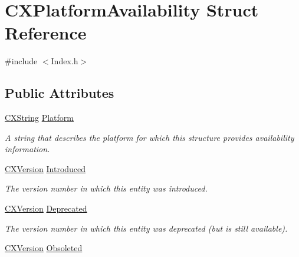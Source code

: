 \hypertarget{structCXPlatformAvailability}{}\section{C\+X\+Platform\+Availability Struct Reference}
\label{structCXPlatformAvailability}


{\ttfamily \#include $<$Index.\+h$>$}

\subsection*{Public Attributes}
\begin{DoxyCompactItemize}
\item 
\mbox{\hyperlink{structCXString}{C\+X\+String}} \mbox{\hyperlink{structCXPlatformAvailability_a4ae9c3ed26d1701f0cd42d6743f3e901}{Platform}}
\begin{DoxyCompactList}\small\item\em A string that describes the platform for which this structure provides availability information. \end{DoxyCompactList}\item 
\mbox{\label{structCXPlatformAvailability_ac3dcb0445f895215db556beadd6d0c91}} 
\mbox{\hyperlink{structCXVersion}{C\+X\+Version}} \mbox{\hyperlink{structCXPlatformAvailability_ac3dcb0445f895215db556beadd6d0c91}{Introduced}}
\begin{DoxyCompactList}\small\item\em The version number in which this entity was introduced. \end{DoxyCompactList}\item 
\mbox{\label{structCXPlatformAvailability_ab97c416a610961bbe0e3f316bc726b09}} 
\mbox{\hyperlink{structCXVersion}{C\+X\+Version}} \mbox{\hyperlink{structCXPlatformAvailability_ab97c416a610961bbe0e3f316bc726b09}{Deprecated}}
\begin{DoxyCompactList}\small\item\em The version number in which this entity was deprecated (but is still available). \end{DoxyCompactList}\item 
\mbox{\label{structCXPlatformAvailability_a55e178964401575e70088e6ff20ed5da}} 
\mbox{\hyperlink{structCXVersion}{C\+X\+Version}} \mbox{\hyperlink{structCXPlatformAvailability_a55e178964401575e70088e6ff20ed5da}{Obsoleted}}

\end{DoxyCompactItemize}
